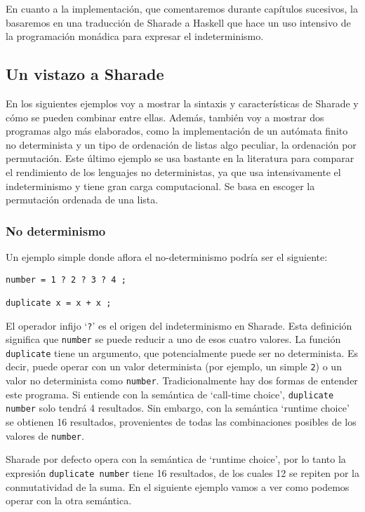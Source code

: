 \documentclass[class=article, crop=false]{standalone}
\begin{document}
En cuanto a la implementación, que comentaremos durante capítulos sucesivos, la basaremos en
una traducción de Sharade a Haskell que hace un uso intensivo de la programación monádica
para expresar el indeterminismo.

\subsection{Un vistazo a Sharade}

En los siguientes ejemplos voy a mostrar la sintaxis y características de Sharade y cómo se
pueden combinar entre ellas. Además, también voy a mostrar dos programas algo más elaborados,
como la implementación de un autómata finito no determinista y un tipo de ordenación de
listas algo peculiar, la ordenación por permutación. Este último ejemplo se usa bastante en
la literatura para comparar el rendimiento de los lenguajes no deterministas, ya que usa
intensivamente el indeterminismo y tiene gran carga computacional. Se basa en escoger la
permutación ordenada de una lista.

\subsubsection{No determinismo}

Un ejemplo simple donde aflora el no-determinismo podría ser el siguiente:

\begin{verbatim}
number = 1 ? 2 ? 3 ? 4 ;

duplicate x = x + x ;
\end{verbatim}

El operador infijo `\verb`?`' es el origen del indeterminismo en Sharade. Esta definición
significa que \verb`number` se puede reducir a uno de esos cuatro valores. La función
\verb`duplicate` tiene un argumento, que potencialmente puede ser no determinista. Es decir,
puede operar con un valor determinista (por ejemplo, un simple \verb`2`) o un valor no
determinista como \verb`number`. Tradicionalmente hay dos formas de entender este programa.
Si entiende con la semántica de `call-time choice', \verb`duplicate number` solo tendrá 4
resultados. Sin embargo, con la semántica `runtime choice' se obtienen 16 resultados,
provenientes de todas las combinaciones posibles de los valores de \verb`number`.

Sharade por defecto opera con la semántica de `runtime choice', por lo tanto la expresión
\verb`duplicate number` tiene 16 resultados, de los cuales 12 se repiten por la
conmutatividad de la suma. En el siguiente ejemplo vamos a ver como podemos operar con la
otra semántica.
\end{document}
